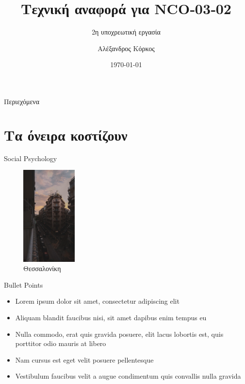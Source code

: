 \documentclass[aspectratio=169]{beamer}
\title{Τεχνική αναφορά για NCO‐03‐02}
\subtitle{2η υποχρεωτική εργασία}
\author{Αλέξανδρος Κόρκος}
\institute{Αριστοτέλειο Πανεπιστήμιο Θεσσαλονίκης \\ Τμήμα Πληροφορικής}
\date{\today}
\begin{document}
    \frame{\titlepage}

    

    \begin{frame}{Περιεχόμενα}
        \tableofcontents
    \end{frame}

    \section{Τα όνειρα κοστίζουν}

    \begin{frame}{Social Psychology}
        \lipsum[1]
    \end{frame}

    \begin{frame}
        \begin{figure}
            \includegraphics[width=0.25\textwidth]{images/skg.jpg}
            \caption{Θεσσαλονίκη}
            \label{fig:skg}
        \end{figure}
    \end{frame}

    \begin{frame}{Bullet Points}
        \begin{itemize}
            \item Lorem ipsum dolor sit amet, consectetur adipiscing elit
            \item Aliquam blandit faucibus nisi, sit amet dapibus enim tempus eu
            \item Nulla commodo, erat quis gravida posuere, elit lacus lobortis est, quis porttitor odio mauris at libero
            \item Nam cursus est eget velit posuere pellentesque
            \item Vestibulum faucibus velit a augue condimentum quis convallis nulla gravida
        \end{itemize}
    \end{frame}
\end{document}
